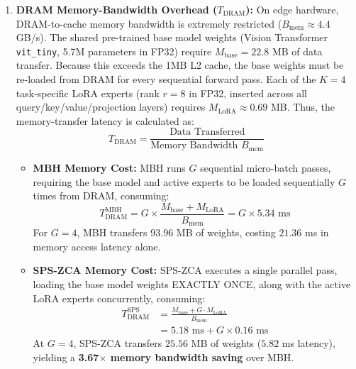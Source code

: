 \begin{enumerate}
    \item \textbf{DRAM Memory-Bandwidth Overhead ($T_{\text{DRAM}}$):} On edge hardware, DRAM-to-cache memory bandwidth is extremely restricted ($B_{\text{mem}} \approx 4.4$ GB/s). 
    The shared pre-trained base model weights (Vision Transformer \texttt{vit\_tiny}, 5.7M parameters in FP32) require $M_{\text{base}} = 22.8$ MB of data transfer. Because this exceeds the 1MB L2 cache, the base weights must be re-loaded from DRAM for every sequential forward pass.
    Each of the $K=4$ task-specific LoRA experts (rank $r=8$ in FP32, inserted across all query/key/value/projection layers) requires $M_{\text{LoRA}} \approx 0.69$ MB.
    Thus, the memory-transfer latency is calculated as:
    \begin{equation}
        T_{\text{DRAM}} = \frac{\text{Data Transferred}}{\text{Memory Bandwidth } B_{\text{mem}}}
    \end{equation}
    \begin{itemize}
        \item \textbf{MBH Memory Cost:} MBH runs $G$ sequential micro-batch passes, requiring the base model and active experts to be loaded sequentially $G$ times from DRAM, consuming:
        \begin{equation}
            T_{\text{DRAM}}^{\text{MBH}} = G \times \frac{M_{\text{base}} + M_{\text{LoRA}}}{B_{\text{mem}}} = G \times 5.34 \text{ ms}
        \end{equation}
        For $G=4$, MBH transfers $93.96$ MB of weights, costing $21.36$ ms in memory access latency alone.
        \item \textbf{SPS-ZCA Memory Cost:} SPS-ZCA executes a single parallel pass, loading the base model weights EXACTLY ONCE, along with the active LoRA experts concurrently, consuming:
        \begin{equation}
        \begin{aligned}
            T_{\text{DRAM}}^{\text{SPS}} &= \frac{M_{\text{base}} + G \cdot M_{\text{LoRA}}}{B_{\text{mem}}} \\
            &= 5.18 \text{ ms} + G \times 0.16 \text{ ms}
        \end{aligned}
        \end{equation}
        At $G=4$, SPS-ZCA transfers $25.56$ MB of weights ($5.82$ ms latency), yielding a \textbf{3.67$\times$ memory band\-width saving} over MBH.
    \end{itemize}


\end{enumerate}
